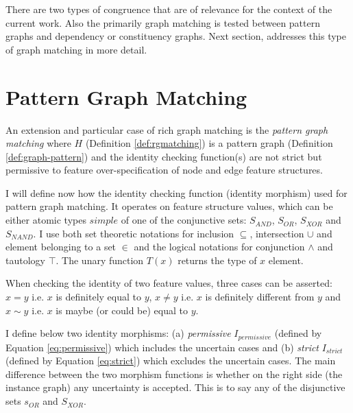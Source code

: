 %    


There are two types of congruence that are of relevance for the context of the current work. Also the primarily graph matching is tested between pattern graphs and dependency or constituency graphs. Next section, addresses this type of graph matching in more detail. 

\section{Pattern Graph Matching}
\label{sec:pattern-graph-matching}
An extension and particular case of rich graph matching is the \textit{pattern graph matching} where $H$ (Definition \ref{def:rgmatching}) is a pattern graph (Definition \ref{def:graph-pattern}) and the identity checking function(s) are not strict but permissive to feature over-specification of node and edge feature structures. 

I will define now how the identity checking function (identity morphism) used for pattern graph matching. It operates on feature structure values, which can be either atomic types $simple$ of one of the conjunctive sets: $S_{AND}$, $S_{OR}$, $S_{XOR}$ and $S_{NAND}$. I use both set theoretic notations for inclusion $\subseteq$, intersection $\cup$ and element belonging to a set $\in$ and the logical notations for conjunction $\wedge$ and tautology $\top$. The unary function $T(x)$ returns the type of $x$ element. 

When checking the identity of two feature values, three cases can be asserted: $x=y$ i.e. $x$ is definitely equal to $y$, $x\neq y$ i.e. $x$ is definitely different from $y$ and $x\sim y$ i.e. $x$ is maybe (or could be) equal to $y$. 

I define below two identity morphisms: (a) \textit{permissive} $I_{permissive}$ (defined by Equation \ref{eq:permissive}) which includes the uncertain cases and (b) \textit{strict} $I_{strict}$ (defined by Equation \ref{eq:strict}) which excludes the uncertain cases. The main difference between the two morphism functions is whether on the right side (the instance graph) any uncertainty is accepted. This is to say any of the disjunctive sets $s_{OR}$ and $S_{XOR}$. 

